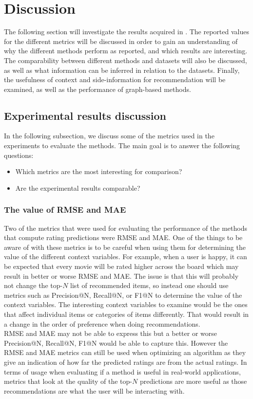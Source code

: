 \section{Discussion}\label{sec:discussion}
The following section will investigate the results acquired in .
The reported values for the different metrics will be discussed in order to gain an understanding of why the different methods perform as reported, and which results are interesting.
The comparability between different methods and datasets will also be discussed, as well as what information can be inferred in relation to the datasets.
Finally, the usefulness of context and side-information for recommendation will be examined, as well as the performance of graph-based methods.

\subsection{Experimental results discussion}
In the following subsection, we discuss some of the metrics used in the experiments to evaluate the methods.
The main goal is to answer the following questions:
\begin{itemize}
    \item Which metrics are the most interesting for comparison?
    \item Are the experimental results comparable?
\end{itemize}

\subsubsection{The value of RMSE and MAE}
Two of the metrics that were used for evaluating the performance of the methods that compute rating predictions were RMSE and MAE.
One of the things to be aware of with these metrics is to be careful when using them for determining the value of the different context variables.
For example, when a user is happy, it can be expected that every movie will be rated higher across the board which may result in better or worse RMSE and MAE.
The issue is that this will probably not change the top-$N$ list of recommended items, so instead one should use metrics such as Precision@N, Recall@N, or F1@N to determine the value of the context variables.
The interesting context variables to examine would be the ones that affect individual items or categories of items differently.
That would result in a change in the order of preference when doing recommendations.
\\
RMSE and MAE may not be able to express this but a better or worse Precision@N, Recall@N, F1@N would be able to capture this.
However the RMSE and MAE metrics can still be used when optimizing an algorithm as they give an indication of how far the predicted ratings are from the actual ratings.
In terms of usage when evaluating if a method is useful in real-world applications, metrics that look at the quality of the top-$N$ predictions are more useful as those recommendations are what the user will be interacting with.

